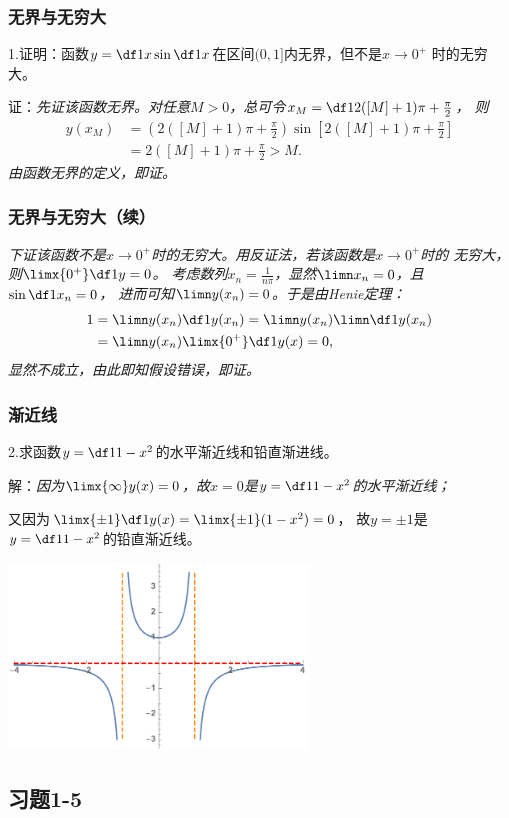 \begin{frame}[t]\frametitle{无界与无穷大}
\large
1.证明：函数$y=\df1x\sin\df1x$在区间$(0,1]$内无界，但不是$x\to0^+$
时的无穷大。

\bs
证：\it 先证该函数无界。对任意$M>0$，总可令$x_M=\df1{2([M]+1)\pi+\frac{\pi}2}$，
则
\begin{align*}
	y(x_M)&=\left(2([M]+1)\pi+\frac{\pi}2\right)
	\sin\left[2([M]+1)\pi+\frac{\pi}2\right]\\
	&=2([M]+1)\pi+\frac{\pi}2>M.
\end{align*}
由函数无界的定义，即证。
\end{frame}

\begin{frame}[t]\frametitle{无界与无穷大（续）}
\large
\it 下证该函数不是$x\to0^+$时的无穷大。用反证法，若该函数是$x\to0^+$时的
无穷大，则$\limx{0^+}\df1y=0$。
考虑数列$x_n=\frac1{n\pi}$，显然$\limn x_n=0$，且$\sin\df1{x_n}=0$，
进而可知$\limn y(x_n)=0$。于是由Henie定理：
\begin{align*}
	1&=\limn y(x_n)\df1{y(x_n)}
	=\limn y(x_n)\limn\df1{y(x_n)}\\
	&=\limn y(x_n)\limx{0^+}\df1{y(x)}=0,
\end{align*}
显然不成立，由此即知假设错误，即证。\fin
\end{frame}

\begin{frame}[t]\frametitle{渐近线}
\large
2.求函数$y=\df1{1-x^2}$的水平渐近线和铅直渐进线。

解：\it 因为$\limx{\infty}y(x)=0$，故$x=0$是$y=\df1{1-x^2}$的水平渐近线；

又因为$\limx{\pm1}\df1{y(x)}=\limx{\pm1}(1-x^2)=0$，
故$y=\pm1$是$y=\df1{1-x^2}$的铅直渐近线。\fin

\centering
\includegraphics[width=0.6\textwidth]
{./images/ch01/11-x2.pdf}
\end{frame}

\subsection{习题1-5}

